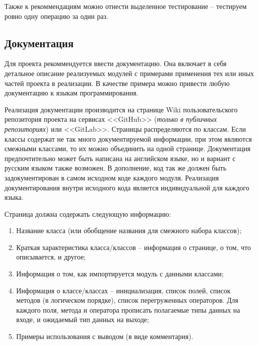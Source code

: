 	Также к рекоммендациям можно отнести выделенное тестирование -- тестируем ровно одну операцию за один раз.

\subsection{Документация}

	Для проекта рекоммендуется ввести документацию. Она включает в себя детальное описание реализуемых модулей с примерами применения тех или иных частей проекта в реализации. В качестве примера можно привести любую документацию к языкам программирования.

	Реализация документации производится на странице Wiki пользовательского репозитория проекта на сервисах <<GitHub>> (\textit{только в публичных репозиториях}) или <<GitLab>>. Страницы распределяются по классам. Если классы содержат не так много документируемой информации, при этом являются смежными классами, то их можно объединить на одной странице. Документация предпочтительно может быть написана на английском языке, но и вариант с русским языком также возможен. В дополнение, код так же должен быть задокументирован в самом исходном коде каждого модуля. Реализация документирования внутри исходного кода является индивидуальной для каждого языка.

	Страница должна содержать следующую информацию:
	\begin{enumerate}
		\item Название класса (или обобщение названия для смежного набора классов);
		\item Краткая характеристика класса/классов -- информация о странице, о том, что описывается, и другое;
		\item Информация о том, как импортируется модуль с данными классами;
		\item Информация о классе/классах -- инициализация, список полей, список методов (в логическом порядке), список перегруженных операторов. Для каждого поля, метода и оператора прописать полагаемые типы данных на входе, и ожидаемый тип данных на выходе;
		\item Примеры использования с выводом (в виде комментария).
	\end{enumerate}

